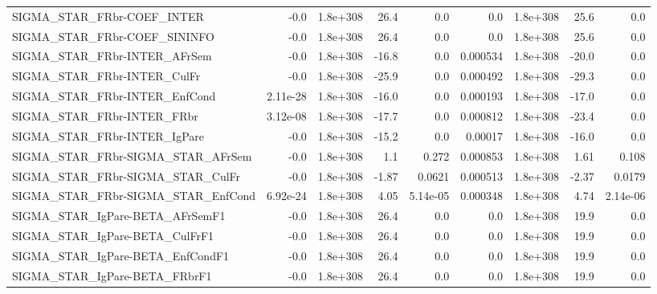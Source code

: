 \begin{tabular}{lrrrrrrrr}
SIGMA\_STAR\_FRbr-COEF\_INTER           &        -0.0 &     1.8e+308 &    26.4 &      0.0 &        0.0 &    1.8e+308 &         25.6 &           0.0 \\
SIGMA\_STAR\_FRbr-COEF\_SININFO         &        -0.0 &     1.8e+308 &    26.4 &      0.0 &        0.0 &    1.8e+308 &         25.6 &           0.0 \\
SIGMA\_STAR\_FRbr-INTER\_AFrSem         &        -0.0 &     1.8e+308 &   -16.8 &      0.0 &   0.000534 &    1.8e+308 &        -20.0 &           0.0 \\
SIGMA\_STAR\_FRbr-INTER\_CulFr          &        -0.0 &     1.8e+308 &   -25.9 &      0.0 &   0.000492 &    1.8e+308 &        -29.3 &           0.0 \\
SIGMA\_STAR\_FRbr-INTER\_EnfCond        &    2.11e-28 &     1.8e+308 &   -16.0 &      0.0 &   0.000193 &    1.8e+308 &        -17.0 &           0.0 \\
SIGMA\_STAR\_FRbr-INTER\_FRbr           &    3.12e-08 &     1.8e+308 &   -17.7 &      0.0 &   0.000812 &    1.8e+308 &        -23.4 &           0.0 \\
SIGMA\_STAR\_FRbr-INTER\_IgPare         &        -0.0 &     1.8e+308 &   -15.2 &      0.0 &    0.00017 &    1.8e+308 &        -16.0 &           0.0 \\
SIGMA\_STAR\_FRbr-SIGMA\_STAR\_AFrSem    &        -0.0 &     1.8e+308 &     1.1 &    0.272 &   0.000853 &    1.8e+308 &         1.61 &         0.108 \\
SIGMA\_STAR\_FRbr-SIGMA\_STAR\_CulFr     &        -0.0 &     1.8e+308 &   -1.87 &   0.0621 &   0.000513 &    1.8e+308 &        -2.37 &        0.0179 \\
SIGMA\_STAR\_FRbr-SIGMA\_STAR\_EnfCond   &    6.92e-24 &     1.8e+308 &    4.05 & 5.14e-05 &   0.000348 &    1.8e+308 &         4.74 &      2.14e-06 \\
SIGMA\_STAR\_IgPare-BETA\_AFrSemF1      &        -0.0 &     1.8e+308 &    26.4 &      0.0 &        0.0 &    1.8e+308 &         19.9 &           0.0 \\
SIGMA\_STAR\_IgPare-BETA\_CulFrF1       &        -0.0 &     1.8e+308 &    26.4 &      0.0 &        0.0 &    1.8e+308 &         19.9 &           0.0 \\
SIGMA\_STAR\_IgPare-BETA\_EnfCondF1     &        -0.0 &     1.8e+308 &    26.4 &      0.0 &        0.0 &    1.8e+308 &         19.9 &           0.0 \\
SIGMA\_STAR\_IgPare-BETA\_FRbrF1        &        -0.0 &     1.8e+308 &    26.4 &      0.0 &        0.0 &    1.8e+308 &         19.9 &           0.0 \\

\end{tabular}
